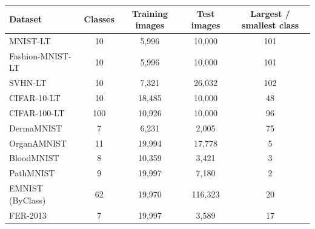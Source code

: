 \begin{tabular}{lcccc}
\toprule
Dataset & Classes & Training images & Test images & Largest / smallest class\\
\midrule
MNIST-LT & 10 & 5,996 & 10,000 & 101\\
Fashion-MNIST-LT & 10 & 5,996 & 10,000 & 101\\
SVHN-LT & 10 & 7,321 & 26,032 & 102\\
CIFAR-10-LT & 10 & 18,485 & 10,000 & 48\\
CIFAR-100-LT & 100 & 10,926 & 10,000 & 96\\
DermaMNIST & 7 & 6,231 & 2,005 & 75\\
OrganAMNIST & 11 & 19,994 & 17,778 & 5\\
BloodMNIST & 8 & 10,359 & 3,421 & 3\\
PathMNIST & 9 & 19,997 & 7,180 & 2\\
EMNIST (ByClass) & 62 & 19,970 & 116,323 & 20\\
FER-2013 & 7 & 19,997 & 3,589 & 17\\
\bottomrule
\end{tabular}
